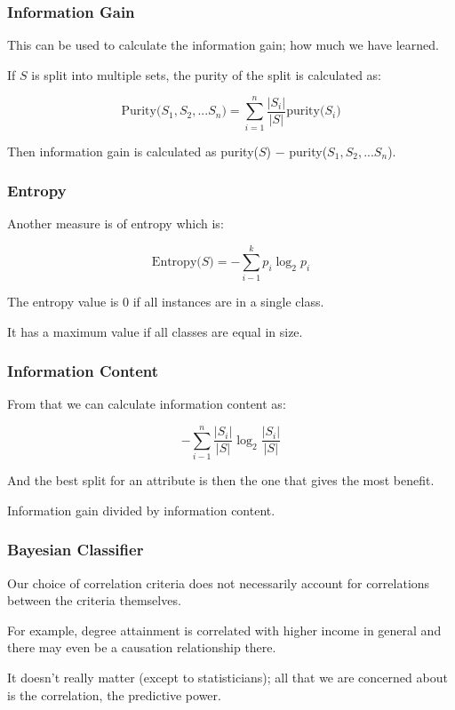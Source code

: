 \begin{frame}
\frametitle{Information Gain}

This can be used to calculate the information gain; how much we have learned. 

If $S$ is split into multiple sets, the purity of the split is calculated as:

$$\mbox{Purity($S_{1}, S_{2}, ... S_{n}$)} = \sum_{i = 1}^{n}\dfrac{|S_{i}|}{|S|} \mbox{purity($S_{i}$)}$$

Then information gain is calculated as purity($S$) $-$ purity($S_{1}, S_{2}, ... S_{n}$).

\end{frame}

\begin{frame}
\frametitle{Entropy}

Another measure is of entropy which is:

$$\mbox{Entropy($S$)} = - \sum_{i-1}^{k}p_{i} \log_{2} p_{i}$$

The entropy value is 0 if all instances are in a single class. 

It has a maximum value if all classes are equal in size.

\end{frame}

\begin{frame}
\frametitle{Information Content}

From that we can calculate information content as:

$$ - \sum_{i-1}^{n} \dfrac{|S_{i}|}{|S|}  \log_{2} \dfrac{|S_{i}|}{|S|} $$

And the best split for an attribute is then the one that gives the most benefit.

Information gain divided by information content.

\end{frame}

\begin{frame}
\frametitle{Bayesian Classifier}

Our choice of correlation criteria does not necessarily account for correlations between the criteria themselves. 

For example, degree attainment is correlated with higher income  in general and there may even be a causation relationship there.

It doesn't really matter (except to statisticians); all that we are concerned about is the correlation, the predictive power.


\end{frame}


